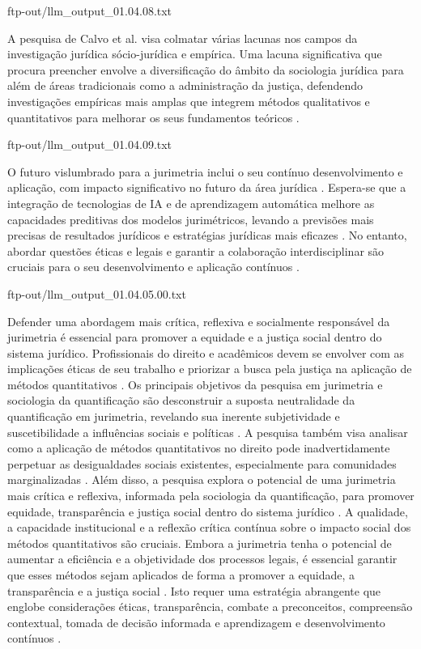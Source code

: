 ftp-out/llm_output_01.04.08.txt 

A pesquisa de Calvo et al. visa colmatar várias lacunas nos campos da investigação jurídica sócio-jurídica e empírica. Uma lacuna significativa que procura preencher envolve a diversificação do âmbito da sociologia jurídica para além de áreas tradicionais como a administração da justiça, defendendo investigações empíricas mais amplas que integrem métodos qualitativos e quantitativos para melhorar os seus fundamentos teóricos \cite{calvo2023}. 

ftp-out/llm_output_01.04.09.txt 

O futuro vislumbrado para a jurimetria inclui o seu contínuo desenvolvimento e aplicação, com impacto significativo no futuro da área jurídica \cite{silva2023role,nunes2016jurimetria}. Espera-se que a integração de tecnologias de IA e de aprendizagem automática melhore as capacidades preditivas dos modelos jurimétricos, levando a previsões mais precisas de resultados jurídicos e estratégias jurídicas mais eficazes \cite{silva2023role,nunes2016jurimetria}. No entanto, abordar questões éticas e legais e garantir a colaboração interdisciplinar são cruciais para o seu desenvolvimento e aplicação contínuos \cite{silva2023role,nunes2016jurimetria}. 

ftp-out/llm_output_01.04.05.00.txt 

Defender uma abordagem mais crítica, reflexiva e socialmente responsável da jurimetria é essencial para promover a equidade e a justiça social dentro do sistema jurídico. Profissionais do direito e acadêmicos devem se envolver com as implicações éticas de seu trabalho e priorizar a busca pela justiça na aplicação de métodos quantitativos \cite{10.1007/s11186-021-09453-1,10.3390/fi9040068}. Os principais objetivos da pesquisa em jurimetria e sociologia da quantificação são desconstruir a suposta neutralidade da quantificação em jurimetria, revelando sua inerente subjetividade e suscetibilidade a influências sociais e políticas \cite{10.1007/s11186-021-09453-1,10.3390/ fi9040068}. A pesquisa também visa analisar como a aplicação de métodos quantitativos no direito pode inadvertidamente perpetuar as desigualdades sociais existentes, especialmente para comunidades marginalizadas \cite{10.1007/s11186-021-09453-1,10.3390/fi9040068}. Além disso, a pesquisa explora o potencial de uma jurimetria mais crítica e reflexiva, informada pela sociologia da quantificação, para promover equidade, transparência e justiça social dentro do sistema jurídico \cite{10.1007/s11186-021-09453-1,10.3390/ fi9040068}. A qualidade, a capacidade institucional e a reflexão crítica contínua sobre o impacto social dos métodos quantitativos são cruciais. Embora a jurimetria tenha o potencial de aumentar a eficiência e a objetividade dos processos legais, é essencial garantir que esses métodos sejam aplicados de forma a promover a equidade, a transparência e a justiça social \cite{10.1590/dados.2022.65.3.267,1023071190721}. Isto requer uma estratégia abrangente que englobe considerações éticas, transparência, combate a preconceitos, compreensão contextual, tomada de decisão informada e aprendizagem e desenvolvimento contínuos \cite{10.1590/dados.2022.65.3.267,1023071190721}. 
